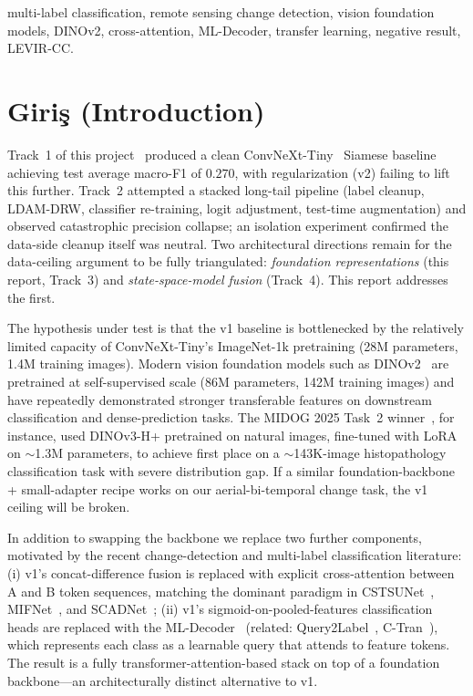 \documentclass[journal]{IEEEtran}
\begin{document}
\begin{IEEEkeywords}
multi-label classification, remote sensing change detection, vision foundation models, DINOv2, cross-attention, ML-Decoder, transfer learning, negative result, LEVIR-CC.
\end{IEEEkeywords}

\section{Giri\c{s} (Introduction)}\label{sec:giris}
Track~1 of this project~\cite{liu2022levircc} produced a clean ConvNeXt-Tiny~\cite{liu2022convnext} Siamese baseline achieving test average macro-F1 of $0.270$, with regularization (v2) failing to lift this further. Track~2 attempted a stacked long-tail pipeline (label cleanup, LDAM-DRW, classifier re-training, logit adjustment, test-time augmentation) and observed catastrophic precision collapse; an isolation experiment confirmed the data-side cleanup itself was neutral. Two architectural directions remain for the data-ceiling argument to be fully triangulated: \emph{foundation representations} (this report, Track~3) and \emph{state-space-model fusion} (Track~4). This report addresses the first.

The hypothesis under test is that the v1 baseline is bottlenecked by the relatively limited capacity of ConvNeXt-Tiny's ImageNet-1k pretraining (28M parameters, 1.4M training images). Modern vision foundation models such as DINOv2~\cite{oquab2024dinov2} are pretrained at self-supervised scale (86M parameters, 142M training images) and have repeatedly demonstrated stronger transferable features on downstream classification and dense-prediction tasks. The MIDOG 2025 Task~2 winner~\cite{balezo2025midog}, for instance, used DINOv3-H+ pretrained on natural images, fine-tuned with LoRA on $\sim$1.3M parameters, to achieve first place on a $\sim$143K-image histopathology classification task with severe distribution gap. If a similar foundation-backbone + small-adapter recipe works on our aerial-bi-temporal change task, the v1 ceiling will be broken.

In addition to swapping the backbone we replace two further components, motivated by the recent change-detection and multi-label classification literature: (i) v1's concat-difference fusion is replaced with explicit cross-attention between A and B token sequences, matching the dominant paradigm in CSTSUNet~\cite{wu2023cstsunet}, MIFNet~\cite{xie2025mifnet}, and SCADNet~\cite{xu2022scad}; (ii) v1's sigmoid-on-pooled-features classification heads are replaced with the ML-Decoder~\cite{ridnik2023mldecoder} (related: Query2Label~\cite{liu2021query2label}, C-Tran~\cite{lanchantin2021ctran}), which represents each class as a learnable query that attends to feature tokens. The result is a fully transformer-attention-based stack on top of a foundation backbone---an architecturally distinct alternative to v1.
\end{document}
